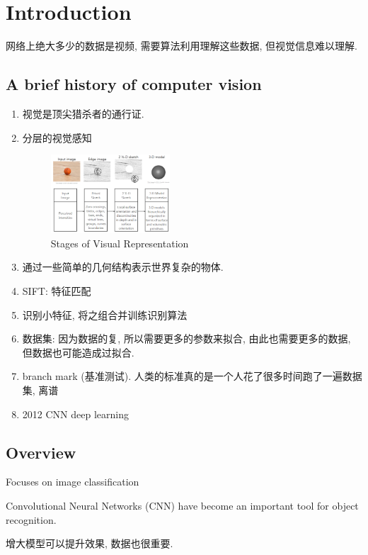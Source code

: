 \newpage
\section{Introduction}
网络上绝大多少的数据是视频, 需要算法利用理解这些数据, 但视觉信息难以理解. 

\subsection{A brief history of computer vision}
\begin{enumerate}
    \item 视觉是顶尖猎杀者的通行证. 
    \item 分层的视觉感知
    \begin{figure}[!htb]
        \centering
        \includegraphics[width=0.42\textwidth]{pic/Lec1/Stages of Visual Representation.png}
        \caption{Stages of Visual Representation}
    \end{figure}
    \item 通过一些简单的几何结构表示世界复杂的物体. 
    \item SIFT: 特征匹配
    \item 识别小特征, 将之组合并训练识别算法
    \item 数据集: 因为数据的复, 所以需要更多的参数来拟合, 由此也需要更多的数据, 但数据也可能造成过拟合. 
    \item branch mark (基准测试). 人类的标准真的是一个人花了很多时间跑了一遍数据集, 离谱
    \item 2012 CNN deep learning
\end{enumerate}


\subsection{Overview}
Focuses on image classification

Convolutional Neural Networks (CNN) have become an important tool for object recognition. 

增大模型可以提升效果, 数据也很重要. 



